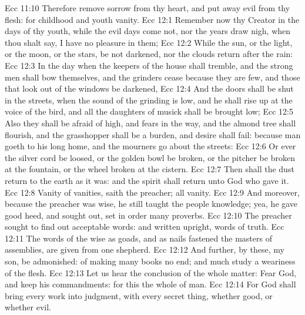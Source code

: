 \vs Ecc 11:10 Therefore remove sorrow from thy heart, and put away evil from thy flesh: for childhood and youth  vanity.
\vs Ecc 12:1 Remember now thy Creator in the days of thy youth, while the evil days come not, nor the years draw nigh, when thou shalt say, I have no pleasure in them;
\vs Ecc 12:2 While the sun, or the light, or the moon, or the stars, be not darkened, nor the clouds return after the rain:
\vs Ecc 12:3 In the day when the keepers of the house shall tremble, and the strong men shall bow themselves, and the grinders cease because they are few, and those that look out of the windows be darkened,
\vs Ecc 12:4 And the doors shall be shut in the streets, when the sound of the grinding is low, and he shall rise up at the voice of the bird, and all the daughters of musick shall be brought low;
\vs Ecc 12:5 Also  they shall be afraid of  high, and fears  in the way, and the almond tree shall flourish, and the grasshopper shall be a burden, and desire shall fail: because man goeth to his long home, and the mourners go about the streets:
\vs Ecc 12:6 Or ever the silver cord be loosed, or the golden bowl be broken, or the pitcher be broken at the fountain, or the wheel broken at the cistern.
\vs Ecc 12:7 Then shall the dust return to the earth as it was: and the spirit shall return unto God who gave it.
\vs Ecc 12:8 Vanity of vanities, saith the preacher; all  vanity.
\vs Ecc 12:9 And moreover, because the preacher was wise, he still taught the people knowledge; yea, he gave good heed, and sought out,  set in order many proverbs.
\vs Ecc 12:10 The preacher sought to find out acceptable words: and  written  upright,  words of truth.
\vs Ecc 12:11 The words of the wise  as goads, and as nails fastened  the masters of assemblies,  are given from one shepherd.
\vs Ecc 12:12 And further, by these, my son, be admonished: of making many books  no end; and much study  a weariness of the flesh.
\vs Ecc 12:13 Let us hear the conclusion of the whole matter: Fear God, and keep his commandments: for this  the whole  of man.
\vs Ecc 12:14 For God shall bring every work into judgment, with every secret thing, whether  good, or whether  evil.
